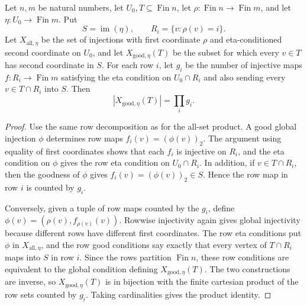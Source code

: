 \begin{helper}
Let \(n,m\) be natural numbers, let \(U_0,T\subseteq \operatorname{Fin} n\),
let \(\rho:\operatorname{Fin}n\to\operatorname{Fin}m\), and let
\(\eta:U_0\to\operatorname{Fin}m\).  Put
\[
S=\operatorname{im}(\eta),\qquad R_i=\{v:\rho(v)=i\}.
\]
Let \(X_{\mathrm{all},\eta}\) be the set of injections with first coordinate
\(\rho\) and eta-conditioned second coordinate on \(U_0\), and let
\(X_{\mathrm{good},\eta}(T)\) be the subset for which every \(v\in T\) has
second coordinate in \(S\).  For each row \(i\), let \(g_i\) be the number
of injective maps \(f:R_i\to\operatorname{Fin}m\) satisfying the eta
condition on \(U_0\cap R_i\) and also sending every \(v\in T\cap R_i\) into
\(S\).  Then
\[
|X_{\mathrm{good},\eta}(T)|=\prod_i g_i.
\]
\end{helper}
\begin{proof}
Use the same row decomposition as for the all-set product.  A good global
injection \(\phi\) determines row maps \(f_i(v)=(\phi(v))_2\).  The
argument using equality of first coordinates shows that each \(f_i\) is
injective on \(R_i\), and the eta condition on \(\phi\) gives the row eta
condition on \(U_0\cap R_i\).  In addition, if \(v\in T\cap R_i\), then the
goodness of \(\phi\) gives \(f_i(v)=(\phi(v))_2\in S\).  Hence the row map
in row \(i\) is counted by \(g_i\).

Conversely, given a tuple of row maps counted by the \(g_i\), define
\(\phi(v)=(\rho(v),f_{\rho(v)}(v))\).  Rowwise injectivity again gives
global injectivity because different rows have different first coordinates.
The row eta conditions put \(\phi\) in \(X_{\mathrm{all},\eta}\), and the
row good conditions say exactly that every vertex of \(T\cap R_i\) maps
into \(S\) in row \(i\).  Since the rows partition \(\operatorname{Fin} n\),
these row conditions are equivalent to the global condition defining
\(X_{\mathrm{good},\eta}(T)\).  The two constructions are inverse, so
\(X_{\mathrm{good},\eta}(T)\) is in bijection with the finite cartesian
product of the row sets counted by \(g_i\).  Taking cardinalities gives the
product identity.
\end{proof}
